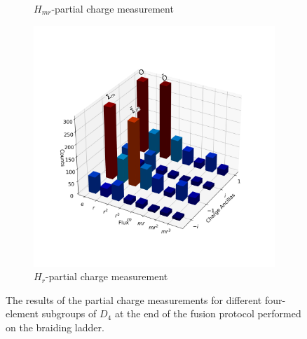 \documentclass[a4paper,twocolumn,11pt]{quantumarticle}
\begin{document}
\begin{figure}
\begin{subfigure}{0.49\linewidth}
        \caption{$H_{mr}$-partial charge measurement}
        \label{fig:glasses_Hmr}
    \end{subfigure}
    \begin{subfigure}{0.5\linewidth}
        \centering
        \includegraphics[width=\linewidth]{Figures/glasses_r.png}
        \caption{$H_r$-partial charge measurement}
        \label{fig:glasses_Hr}
    \end{subfigure}
    \caption{The results of the partial charge measurements for different four-element subgroups of $D_4$ at the end of the fusion protocol performed on the braiding ladder.}
    \label{fig:glasses_all_subs}
\end{figure}
\end{document}
